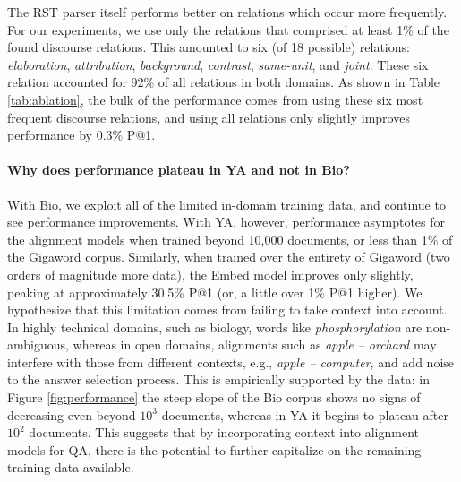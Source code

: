 The RST parser itself performs better on relations which occur more frequently.  For our experiments, we use only the relations that comprised at least 1\% of the found discourse relations.  This amounted to six (of 18 possible) relations: \emph{elaboration}, \emph{attribution}, \emph{background}, \emph{contrast}, \emph{same-unit}, and \emph{joint}.
These six relation accounted for 92\% of all relations in both domains. 
As shown in Table \ref{tab:ablation}, the bulk of the performance comes from using these six most frequent discourse relations, and using all relations only slightly improves performance by 0.3\% P@1.


\paragraph{Why does performance plateau in YA and not in Bio?}

With Bio, we exploit all of the limited in-domain training data, and continue to see performance improvements.  With YA, however, performance asymptotes for the alignment models when trained beyond 10,000 documents, or less than 1\% of the Gigaword corpus.  Similarly, when trained over the entirety of Gigaword (two orders of magnitude more data), the Embed model improves only slightly, peaking at approximately 30.5\% P@1 (or, a little over 1\% P@1 higher).  
We hypothesize that this limitation comes from failing to take context into account. 
In highly technical domains, such as biology, words like {\em phosphorylation} are non-ambiguous, whereas 
in open domains, alignments such as {\em apple -- \mbox{orchard}} may interfere with those from different contexts, e.g., {\em apple -- computer}, and add noise to the answer selection process.  
This is empirically supported by the data: in Figure \ref{fig:performance} the steep slope of the Bio corpus shows no signs of decreasing even beyond $10^{3}$ documents, whereas in YA it begins to plateau after $10^{2}$ documents.  This suggests that by incorporating context into alignment models for QA, there is the potential to further capitalize on the remaining training data available. 


